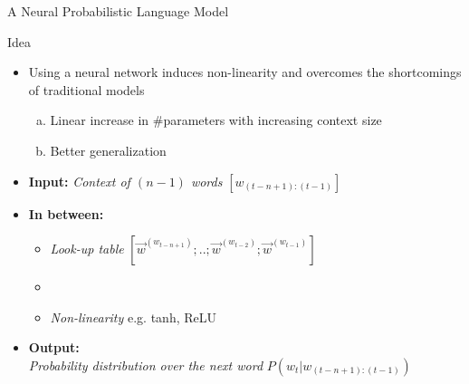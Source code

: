 \begin{frame}{A Neural Probabilistic Language Model}

\vfill

\begin{block}{Idea}
        \begin{itemize}
        \item Using a neural network induces non-linearity and overcomes the shortcomings of traditional models
        \begin{enumerate}[(a)]
            \item Linear increase in $\#$parameters with increasing context size
            \item Better generalization
        \end{enumerate}
        \item \textbf{Input:} {\it Context of $(n-1)$ words} \hfill $[w_{(t-n+1):(t-1)}]$
        \item \textbf{In between:} 
        \begin{itemize}
            \item {\it Look-up table} \hfill $[\vec w^{({w_{t-n+1}})}; .. ; \vec w^{({w_{t-2}})}; \vec w^{({w_{t-1}})}]$
            \item[]
            \item {\it Non-linearity} \hfill e.g. tanh, ReLU
        \end{itemize}
        \item \textbf{Output:}\\{\it Probability distribution over the next word} \hfill $P(w_t|w_{(t-n+1):(t-1)})$
        \end{itemize}
\end{block}

\vfill

\end{frame}


